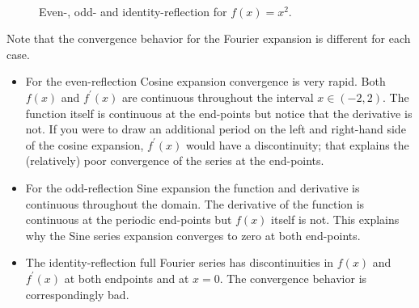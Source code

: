 \begin{figure}
 \\
\begin{center}
\end{center}
\label{fig:lec17-ex3}
\caption{Even-, odd- and identity-reflection for $f(x)=x^2$.}
\end{figure}

Note that the convergence behavior for the Fourier expansion is different for each case.
\begin{itemize}
\item For the even-reflection Cosine expansion convergence is very rapid.  Both $f(x)$ and $f^{\prime}(x)$ are continuous throughout the interval $x\in (-2,2)$.  The function itself is continuous at the end-points but notice that the derivative is not.  If you were to draw an additional period on the left and right-hand side of the cosine expansion, $f^{\prime}(x)$ would have a discontinuity; that explains the (relatively) poor convergence of the series at the end-points.
\item For the odd-reflection Sine expansion the function and derivative is continuous throughout the domain.  The derivative of the function is continuous at the periodic end-points but $f(x)$ itself is not.  This explains why the Sine series expansion converges to zero at both end-points.  
\item The identity-reflection full Fourier series has discontinuities in $f(x)$ and $f^{\prime}(x)$ at both endpoints and at $x=0$.  The convergence behavior is correspondingly bad.
\end{itemize}
